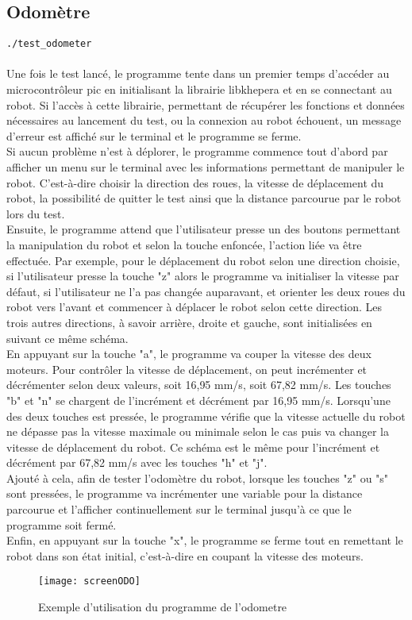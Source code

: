 \documentclass[11pt]{article} %
\begin{document}
\subsection{Odomètre}
\verb|./test_odometer|\\
 \\
Une fois le test lancé, le programme tente dans un premier temps d’accéder au microcontrôleur pic en initialisant la librairie libkhepera et en se connectant au robot. Si l’accès à cette librairie, permettant de récupérer les fonctions et données nécessaires au lancement du test, ou la connexion au robot échouent, un message d’erreur est affiché sur le terminal et le programme se ferme.\\
Si aucun problème n’est à déplorer, le programme commence tout d’abord par afficher un menu sur le terminal avec les informations permettant de manipuler le robot. C’est-à-dire choisir la direction des roues, la vitesse de déplacement du robot, la possibilité de quitter le test ainsi que la distance parcourue par le robot lors du test.\\
Ensuite, le programme attend que l’utilisateur presse un des boutons permettant la manipulation du robot et selon la touche enfoncée, l’action liée va être effectuée. Par exemple, pour le déplacement du robot selon une direction choisie, si l’utilisateur presse la touche "z" alors le programme va initialiser la vitesse par défaut, si l’utilisateur ne l’a pas changée auparavant, et orienter les deux roues du robot vers l’avant et commencer à déplacer le robot selon cette direction. Les trois autres directions, à savoir arrière, droite et gauche, sont initialisées en suivant ce même schéma. \\
En appuyant sur la touche "a", le programme va couper la vitesse des deux moteurs. Pour contrôler la vitesse de déplacement, on peut incrémenter et décrémenter selon deux valeurs, soit 16,95 mm/s, soit 67,82 mm/s. Les touches "b" et "n" se chargent de l’incrément et décrément par 16,95 mm/s. Lorsqu’une des deux touches est pressée, le programme vérifie que la vitesse actuelle du robot ne dépasse pas la vitesse maximale ou minimale selon le cas puis va changer la vitesse de déplacement du robot. Ce schéma est le même pour l’incrément et décrément par 67,82 mm/s avec les touches "h" et "j".\\
Ajouté à cela, afin de tester l’odomètre du robot, lorsque les touches "z" ou "s" sont pressées, le programme va incrémenter une variable pour la distance parcourue et l’afficher continuellement sur le terminal jusqu’à ce que le programme soit fermé.\\
Enfin, en appuyant sur la touche "x", le programme se ferme tout en remettant le robot dans son état initial, c’est-à-dire en coupant la vitesse des moteurs.\\
\begin{figure}[H]
	\caption{Exemple d'utilisation du programme de l'odometre}
	\texttt{[image: screenODO]}
\end{figure}
\end{document}

